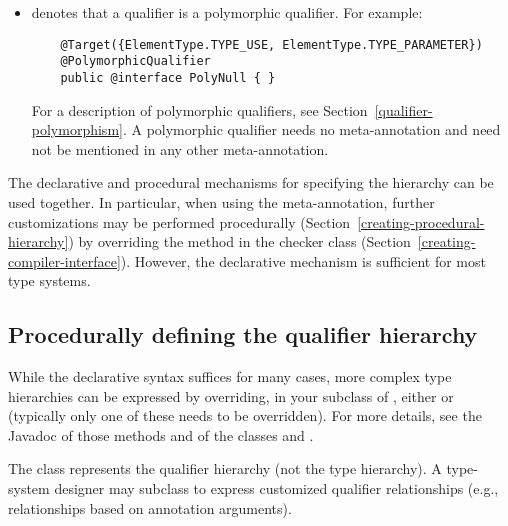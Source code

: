 \begin{itemize}
\item {} denotes that a qualifier is a
  polymorphic qualifier.  For example:

  \begin{Verbatim}
    @Target({ElementType.TYPE_USE, ElementType.TYPE_PARAMETER})
    @PolymorphicQualifier
    public @interface PolyNull { }
  \end{Verbatim}

  For a description of polymorphic qualifiers, see
  Section~\ref{qualifier-polymorphism}.  A polymorphic qualifier needs
  no  meta-annotation and need not be
  mentioned in any other 
  meta-annotation.

\end{itemize}

The declarative and procedural mechanisms for specifying the hierarchy can
be used together.  In particular, when using the 
meta-annotation, further customizations may be
performed procedurally (Section~\ref{creating-procedural-hierarchy})
by overriding the  method in the checker class
(Section~\ref{creating-compiler-interface}).
However, the declarative mechanism is sufficient for most type systems.


\subsection{Procedurally defining the qualifier hierarchy\label{creating-procedural-hierarchy}}

While the declarative syntax suffices for many cases, more complex
type hierarchies can be expressed by overriding, in your subclass of ,
either  or  (typically
only one of these needs to be overridden).
For more details, see the Javadoc of those methods and of the classes
 and .

The  class represents the qualifier hierarchy (not the
type hierarchy).  A type-system designer may subclass
 to express customized qualifier
relationships (e.g., relationships based on annotation
arguments).

